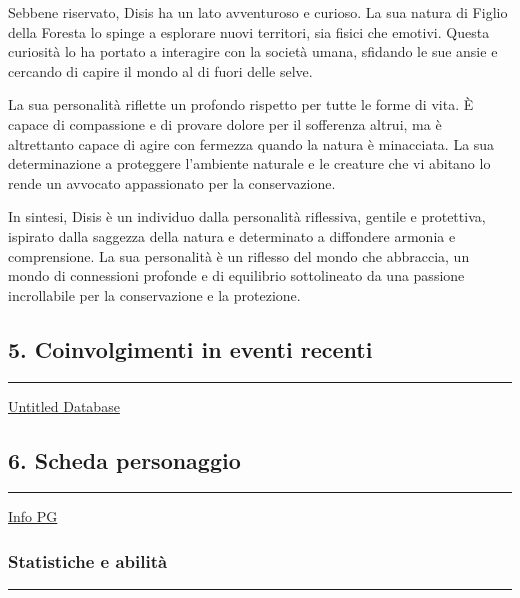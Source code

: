 Sebbene riservato, Disis ha un lato avventuroso e curioso. La sua natura
di Figlio della Foresta lo spinge a esplorare nuovi territori, sia
fisici che emotivi. Questa curiosità lo ha portato a interagire con la
società umana, sfidando le sue ansie e cercando di capire il mondo al di
fuori delle selve.

La sua personalità riflette un profondo rispetto per tutte le forme di
vita. È capace di compassione e di provare dolore per il sofferenza
altrui, ma è altrettanto capace di agire con fermezza quando la natura è
minacciata. La sua determinazione a proteggere l'ambiente naturale e le
creature che vi abitano lo rende un avvocato appassionato per la
conservazione.

In sintesi, Disis è un individuo dalla personalità riflessiva, gentile e
protettiva, ispirato dalla saggezza della natura e determinato a
diffondere armonia e comprensione. La sua personalità è un riflesso del
mondo che abbraccia, un mondo di connessioni profonde e di equilibrio
sottolineato da una passione incrollabile per la conservazione e la
protezione.

\subsection{5. Coinvolgimenti in eventi
recenti}\label{coinvolgimenti-in-eventi-recenti}

\begin{center}\rule{0.5\linewidth}{0.5pt}\end{center}

\href{Untitled\%20Database\%20a9ed8c4986d8400eaf38741b0d8bebc2.csv}{Untitled
Database}

\subsection{6. Scheda personaggio}\label{scheda-personaggio}

\begin{center}\rule{0.5\linewidth}{0.5pt}\end{center}

\href{Info\%20PG\%209e80d78eef0a421386b74e68cc395005.csv}{Info PG}

\subsubsection{Statistiche e abilità}\label{statistiche-e-abilituxe0}

\begin{center}\rule{0.5\linewidth}{0.5pt}\end{center}

